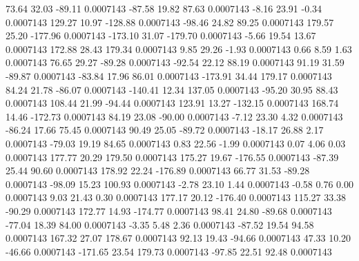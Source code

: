        73.64       32.03      -89.11     0.0007143
      -87.58       19.82       87.63     0.0007143
       -8.16       23.91       -0.34     0.0007143
      129.27       10.97     -128.88     0.0007143
      -98.46       24.82       89.25     0.0007143
      179.57       25.20     -177.96     0.0007143
     -173.10       31.07     -179.70     0.0007143
       -5.66       19.54       13.67     0.0007143
      172.88       28.43      179.34     0.0007143
        9.85       29.26       -1.93     0.0007143
        0.66        8.59        1.63     0.0007143
       76.65       29.27      -89.28     0.0007143
      -92.54       22.12       88.19     0.0007143
       91.19       31.59      -89.87     0.0007143
      -83.84       17.96       86.01     0.0007143
     -173.91       34.44      179.17     0.0007143
       84.24       21.78      -86.07     0.0007143
     -140.41       12.34      137.05     0.0007143
      -95.20       30.95       88.43     0.0007143
      108.44       21.99      -94.44     0.0007143
      123.91       13.27     -132.15     0.0007143
      168.74       14.46     -172.73     0.0007143
       84.19       23.08      -90.00     0.0007143
       -7.12       23.30        4.32     0.0007143
      -86.24       17.66       75.45     0.0007143
       90.49       25.05      -89.72     0.0007143
      -18.17       26.88        2.17     0.0007143
      -79.03       19.19       84.65     0.0007143
        0.83       22.56       -1.99     0.0007143
        0.07        4.06        0.03     0.0007143
      177.77       20.29      179.50     0.0007143
      175.27       19.67     -176.55     0.0007143
      -87.39       25.44       90.60     0.0007143
      178.92       22.24     -176.89     0.0007143
       66.77       31.53      -89.28     0.0007143
      -98.09       15.23      100.93     0.0007143
       -2.78       23.10        1.44     0.0007143
       -0.58        0.76        0.00     0.0007143
        9.03       21.43        0.30     0.0007143
      177.17       20.12     -176.40     0.0007143
      115.27       33.38      -90.29     0.0007143
      172.77       14.93     -174.77     0.0007143
       98.41       24.80      -89.68     0.0007143
      -77.04       18.39       84.00     0.0007143
       -3.35        5.48        2.36     0.0007143
      -87.52       19.54       94.58     0.0007143
      167.32       27.07      178.67     0.0007143
       92.13       19.43      -94.66     0.0007143
       47.33       10.20      -46.66     0.0007143
     -171.65       23.54      179.73     0.0007143
      -97.85       22.51       92.48     0.0007143
